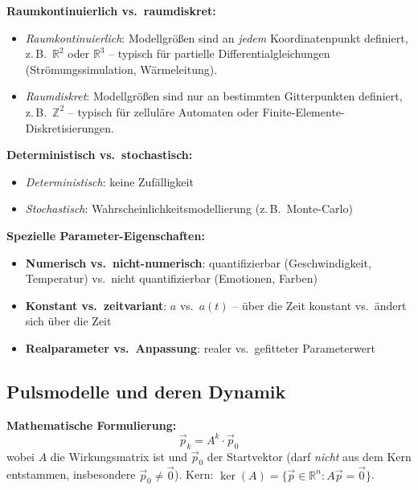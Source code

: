 \textbf{Raumkontinuierlich vs.\ raumdiskret:}
\begin{itemize}[leftmargin=1.5em]
    \item \textit{Raumkontinuierlich}: Modellgrößen sind an \emph{jedem} Koordinatenpunkt definiert, z.\,B.\ $\mathbb{R}^2$ oder $\mathbb{R}^3$ -- typisch für partielle Differentialgleichungen (Strömungssimulation, Wärmeleitung).
    \item \textit{Raumdiskret}: Modellgrößen sind nur an bestimmten Gitterpunkten definiert, z.\,B.\ $\mathbb{Z}^2$ -- typisch für zelluläre Automaten oder Finite-Elemente-Diskretisierungen.
\end{itemize}

\textbf{Deterministisch vs.\ stochastisch:}
\begin{itemize}[leftmargin=1.5em]
    \item \textit{Deterministisch}: keine Zufälligkeit
    \item \textit{Stochastisch}: Wahrscheinlichkeitsmodellierung (z.\,B.\  Monte-Carlo)
\end{itemize}

\textbf{Spezielle Parameter-Eigenschaften:}
\begin{itemize}[leftmargin=1.5em]
    \item \textbf{Numerisch vs.\ nicht-numerisch}: quantifizierbar (Geschwindigkeit, Temperatur) vs.\ nicht quantifizierbar (Emotionen, Farben)
    \item \textbf{Konstant vs.\ zeitvariant}: $a$ vs.\ $a(t)$ -- über die Zeit konstant vs.\ ändert sich über die Zeit
    \item \textbf{Realparameter vs.\ Anpassung}: realer vs.\ gefitteter Parameterwert
\end{itemize}

\newpage

\subsection{Pulsmodelle und deren Dynamik}


\textbf{Mathematische Formulierung:}
$$
\vec{p}_k = A^k \cdot \vec{p}_0
$$
wobei $A$ die Wirkungsmatrix ist und $\vec{p}_0$ der Startvektor (darf \emph{nicht} aus dem Kern entstammen, insbesondere $\vec{p}_0 \neq \vec{0}$). Kern: $\ker(A) = \{\vec{p} \in \mathbb{R}^n : A\vec{p} = \vec{0}\}$.

